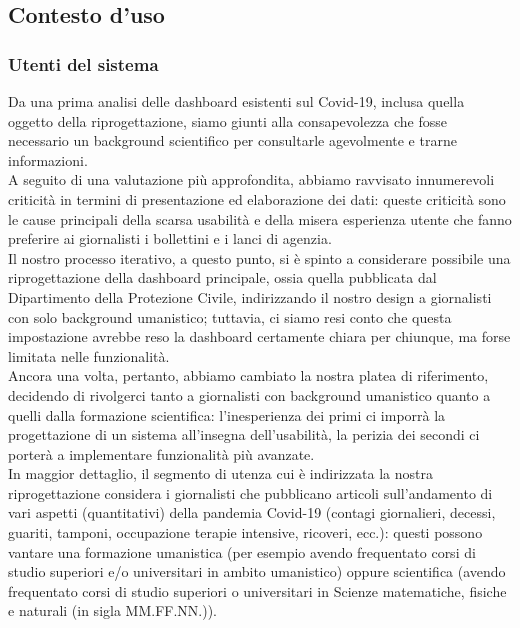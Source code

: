 \subsection{Contesto d'uso}
\subsubsection{Utenti del sistema}
Da una prima analisi delle dashboard esistenti sul Covid-19, inclusa quella oggetto della riprogettazione, siamo giunti alla consapevolezza che fosse necessario un background scientifico per consultarle agevolmente e trarne informazioni.\\
A seguito di una valutazione più approfondita, abbiamo ravvisato innumerevoli criticità in termini di presentazione ed elaborazione dei dati: queste criticità sono le cause principali della scarsa usabilità e della misera esperienza utente che  fanno preferire ai giornalisti i bollettini e i lanci di agenzia.\\
Il nostro processo iterativo, a questo punto, si è spinto a considerare possibile una riprogettazione della dashboard principale, ossia quella pubblicata dal Dipartimento della Protezione Civile, indirizzando il nostro design a giornalisti con solo background umanistico; tuttavia, ci siamo resi conto che questa impostazione avrebbe reso la dashboard certamente chiara per chiunque, ma forse limitata nelle funzionalità.\\ 
Ancora una volta, pertanto, abbiamo cambiato la nostra platea di riferimento, decidendo di rivolgerci tanto a giornalisti con background umanistico quanto a quelli dalla formazione scientifica: l'inesperienza dei primi ci imporrà la progettazione di un sistema all'insegna dell'usabilità, la perizia dei secondi ci porterà a implementare funzionalità più avanzate.\\
In maggior dettaglio, il segmento di utenza cui è indirizzata la nostra riprogettazione considera i giornalisti che pubblicano articoli sull'andamento di vari aspetti (quantitativi) della pandemia Covid-19 (contagi giornalieri, decessi, guariti, tamponi, occupazione terapie intensive, ricoveri, ecc.): questi possono vantare una formazione umanistica (per esempio avendo frequentato corsi di studio superiori e/o universitari in ambito umanistico) oppure scientifica (avendo frequentato corsi di studio superiori o universitari in Scienze matematiche, fisiche e naturali (in sigla MM.FF.NN.)).

